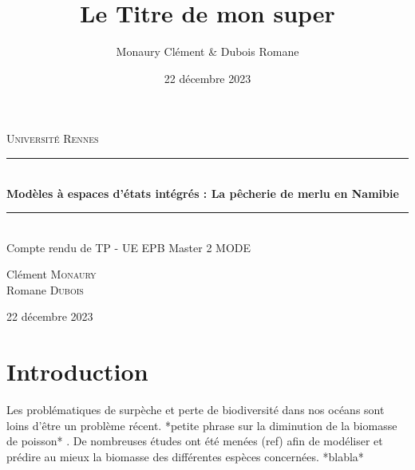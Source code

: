 \documentclass[a4paper,11pt,twoside,openany]{report}
\title{Le Titre de mon super }
\author{Monaury Clément \& Dubois Romane}
\date{22 décembre 2023}
\theoremstyle{plain}
\theoremstyle{definition}
\theoremstyle{remark}
\newcommand{\HRule}{\rule{\linewidth}{0.5mm}}
\begin{document}
\pagestyle{empty}
\begin{titlepage}
  \begin{center}
    \vspace*{-2cm}

    \textsc{\LARGE Université Rennes}\\[1.5cm]

    \HRule\\[0.4cm]

    {\huge \textbf{Modèles à espaces d'états intégrés : La pêcherie de merlu en Namibie}}\\[0.4cm]
    
    \HRule\\[1.5cm]

    Compte rendu de TP -  UE EPB
    Master 2 MODE
    \vfill
    \begin{minipage}{0.4\textwidth}
      \begin{flushleft}
        \large
        Clément \textsc{Monaury}\\
        Romane \textsc{Dubois}
      \end{flushleft}
    \end{minipage}
    \begin{minipage}{0.4\textwidth}
      \begin{flushright}
        \large
        22 décembre 2023\\
      \end{flushright}
    \end{minipage}

    \vfill
  
  \end{center}
\end{titlepage}



\pagestyle{fancy}

\section*{Introduction}
  Les problématiques de surpèche et perte de biodiversité dans nos océans sont loins d'être un problème récent. 
*petite phrase sur la diminution de la biomasse de poisson* .
De nombreuses études ont été menées (ref) afin de modéliser et prédire au mieux la biomasse des différentes 
espèces concernées. *blabla*
\end{document}
